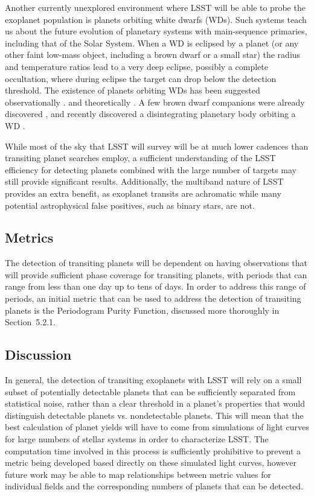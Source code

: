 Another currently unexplored environment where LSST will be able to
probe the exoplanet population is planets orbiting white dwarfs (WDs).
Such systems teach us about the future evolution of planetary systems
with main-sequence primaries, including that of the Solar System. When a
WD is eclipsed by a planet (or any other faint low-mass object,
including a brown dwarf or a small star) the radius and temperature
ratios lead to a very deep eclipse, possibly a complete occultation,
where during eclipse the target can drop below the detection threshold.
The existence of planets orbiting WDs has been suggested
observationally
\citep[e.g.,][]{2009ApJ...694..805F,2009AJ....137.3191J,2010ApJ...722..725Z,2012ApJ...747..148D}.
and theoretically \citep[e.g.,][]{2010MNRAS.408..631N}.
A few brown dwarf companions were already discovered
\citep[e.g.,][]{2006Natur.442..543M,2012ApJ...759L..34C,2006Sci...314.1578L,2014MNRAS.445.2106L},
and \citet{2015Natur.526..546V}
recently discovered a disintegrating planetary body orbiting a WD
\citep[see also][]{2015arXiv151006434C,2016ApJ...818L...7G,2016MNRAS.458.3904R}.

While most of the sky that LSST will survey will be at much lower
cadences than transiting planet searches employ, a sufficient
understanding of the LSST efficiency for detecting planets combined with
the large number of targets may still provide significant results.
Additionally, the multiband nature of LSST provides an extra benefit, as
exoplanet transits are achromatic while many potential astrophysical
false positives, such as binary stars, are not.

\subsection{Metrics}
\label{sec:\secname:metrics}
The detection of transiting planets will be dependent on having observations
that will provide sufficient phase coverage for transiting planets, with periods
that can range from less than one day up to tens of days. In order to address
this range of periods, an initial metric that can be used to address the detection
of transiting planets is the Periodogram Purity Function, discussed more thoroughly
in Section~5.2.1.

\subsection{Discussion}
\label{sec:\secname:discussion}
In general, the detection of transiting exoplanets with LSST will rely on
a small subset of potentially detectable planets that can be sufficiently
separated from statistical noise, rather than a clear threshold in a planet's
properties that would distinguish detectable planets vs. nondetectable planets.
This will mean that the best calculation of planet yields will have to come
from simulations of light curves for large numbers of stellar systems in order
to characterize LSST. The computation time involved in this process is sufficiently
prohibitive to prevent a metric being developed based directly on these
simulated light curves, however future work may be able to map relationships
between metric values for individual fields and the corresponding numbers
of planets that can be detected.

